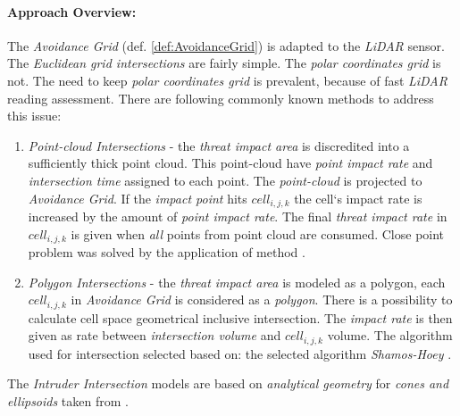 \paragraph{Approach Overview:} The \emph{Avoidance Grid} (def. \ref{def:AvoidanceGrid}) is adapted to the \emph{LiDAR} sensor. The \emph{Euclidean grid intersections} are fairly simple. The \emph{polar coordinates grid} is not. The need to keep \emph{polar coordinates grid} is prevalent, because of fast \emph{LiDAR} reading assessment.  There are following commonly known methods to address this issue:

\begin{enumerate}
    \item\emph{Point-cloud Intersections} - the \emph{threat impact area} is discredited into a sufficiently thick point cloud. This point-cloud have \emph{point impact rate} and \emph{intersection time} assigned to each point. The \emph{point-cloud} is projected to \emph{Avoidance Grid}. If the \emph{impact point} hits $cell_{i,j,k}$ the cell`s impact rate is increased by the amount of \emph{point impact rate}. The final \emph{threat impact rate} in $cell_{i,j,k}$ is given when \emph{all} points from point cloud are consumed. Close point problem \cite{shamos1975closest} was solved by the application of method  \cite{bentley1980optimal}.
    
    \item\emph{Polygon Intersections} - the \emph{threat impact area} is modeled as a polygon, each $cell_{i,j,k}$ in \emph{Avoidance Grid} is considered as a \emph{polygon}. There is a possibility to calculate cell space geometrical inclusive intersection. The \emph{impact rate} is then given as rate between \emph{intersection volume} and $cell_{i,j,k}$ volume. The algorithm used for intersection selected based on:\citep{bentley1979algorithms} the selected algorithm  \emph{Shamos-Hoey} \cite{shamos1976geometric}.
\end{enumerate}

\begin{note}
    The \emph{Intruder Intersection} models are based on \emph{analytical geometry} for \emph{cones and ellipsoids} taken from \cite{sommerville2016analytical}.
\end{note}
